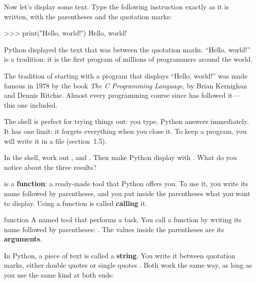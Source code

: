 Now let's display some text. Type the following instruction exactly as it is written, with the
parentheses and the quotation marks:

\begin{console}
>>> print("Hello, world!")
Hello, world!
\end{console}

Python displayed the text that was between the quotation marks. \enquote{Hello, world!} is a
tradition: it is the first program of millions of programmers around the world.

\begin{culture}
The tradition of starting with a program that displays \enquote{Hello, world!} was made famous in
1978 by the book \emph{The C Programming Language}, by Brian Kernighan and Dennis Ritchie. Almost
every programming course since has followed it\,---\,this one included.
\end{culture}

The shell is perfect for trying things out: you type, Python answers immediately. It has one
limit: it forgets everything when you close it. To keep a program, you will write it in a file
(section~1.5).

\begin{atoi}
In the shell, work out ,  and . Then make Python display
 with . What do you notice about the three results?
\end{atoi}


 is a \textbf{function}: a ready-made tool that Python offers you. To use it, you write
its name followed by parentheses, and you put inside the parentheses what you want to display.
Using a function is called \textbf{calling} it.

\begin{definition}{function}
A named tool that performs a task. You call a function by writing its name followed by
parentheses: . The values inside the parentheses are its \textbf{arguments}.
\end{definition}

In Python, a piece of text is called a \textbf{string}. You write it between quotation marks,
either double quotes  or single quotes . Both work the same way, as long as you use the
same kind at both ends:

